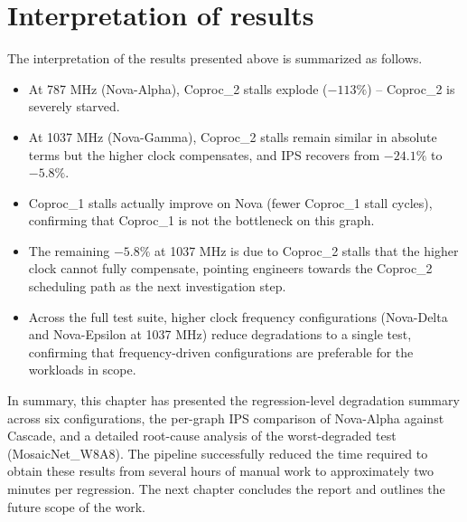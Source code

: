 \section{Interpretation of results}
The interpretation of the results presented above is summarized as follows.
\begin{itemize}
\item At 787 MHz (Nova-Alpha), Coproc\_2 stalls explode (\(-113\%\)) -- Coproc\_2 is severely starved.
\item At 1037 MHz (Nova-Gamma), Coproc\_2 stalls remain similar in absolute terms but the higher clock compensates, and IPS recovers from \(-24.1\%\) to \(-5.8\%\).
\item Coproc\_1 stalls actually improve on Nova (fewer Coproc\_1 stall cycles), confirming that Coproc\_1 is not the bottleneck on this graph.
\item The remaining \(-5.8\%\) at 1037 MHz is due to Coproc\_2 stalls that the higher clock cannot fully compensate, pointing engineers towards the Coproc\_2 scheduling path as the next investigation step.
\item Across the full test suite, higher clock frequency configurations (Nova-Delta and Nova-Epsilon at 1037 MHz) reduce degradations to a single test, confirming that frequency-driven configurations are preferable for the workloads in scope.
\end{itemize}

In summary, this chapter has presented the regression-level degradation summary across six configurations, the per-graph IPS comparison of Nova-Alpha against Cascade, and a detailed root-cause analysis of the worst-degraded test (MosaicNet\_W8A8). The pipeline successfully reduced the time required to obtain these results from several hours of manual work to approximately two minutes per regression. The next chapter concludes the report and outlines the future scope of the work.
